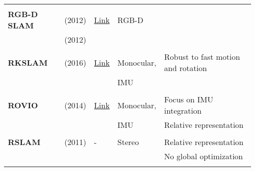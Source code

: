 \documentclass[a4paper,12pt]{scrartcl}
\begin{document}
{\begin{longtable}{l|l|l|l|l}
                           &                                   &                                                                    &                       &\\
    \textbf{RGB-D SLAM}    & \cite{Endres2012} (2012)          & {\href{https://github.com/felixendres/rgbdslam_v2}{Link}}          & RGB-D                 &\\
                           & \cite{Endres2012a} (2012)         &                                                                    &                       &\\
                           &                                   &                                                                    &                       &\\
    \textbf{RKSLAM}        & \cite{Liu2016} (2016)             & {\href{https://zjucvg.net/rkslam/rkslam.html}{Link}}               & Monocular,            & Robust to fast motion and rotation\\
                           &                                   &                                                                    & IMU                   &\\
                           &                                   &                                                                    &                       &\\
    \textbf{ROVIO}         & \cite{Bloesch2015} (2014)         & {\href{https://github.com/ethz-asl/rovio}{Link}}                   & Monocular,            & Focus on IMU integration\\
                           &                                   &                                                                    & IMU                   & Relative representation\\
                           &                                   &                                                                    &                       &\\
    \textbf{RSLAM}         & \cite{Mei2011} (2011)             & -                                                                  & Stereo                & Relative representation\\
                           &                                   &                                                                    &                       & No global optimization \\
                           &                                   &                                                                    &                       &\\

\end{longtable}}
\end{document}
